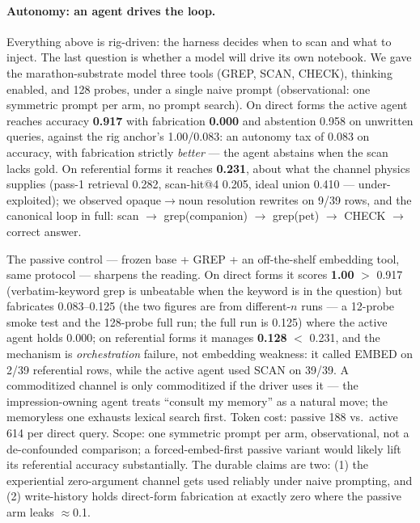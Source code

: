 \documentclass[11pt]{article}
\begin{document}
\paragraph{Autonomy: an agent drives the loop.} Everything above is rig-driven: the harness
decides when to scan and what to inject. The last question is whether a model will drive its
own notebook. We gave the marathon-substrate model three tools (GREP, SCAN, CHECK), thinking
enabled, and 128 probes, under a single naive prompt (observational: one symmetric prompt per
arm, no prompt search). On direct forms the active agent reaches accuracy \textbf{0.917} with
fabrication \textbf{0.000} and abstention 0.958 on unwritten queries, against the rig anchor's
1.00/0.083: an autonomy tax of 0.083 on accuracy, with fabrication strictly \emph{better} ---
the agent abstains when the scan lacks gold. On referential forms it reaches \textbf{0.231},
about what the channel physics supplies (pass-1 retrieval 0.282, scan-hit@4 0.205, ideal union
0.410 --- under-exploited); we observed opaque$\to$noun resolution rewrites on 9/39 rows, and
the canonical loop in full: scan $\to$ grep(companion) $\to$ grep(pet) $\to$ CHECK $\to$
correct answer.

The passive control --- frozen base + GREP + an off-the-shelf embedding tool, same protocol ---
sharpens the reading. On direct forms it scores \textbf{1.00} $>$ 0.917 (verbatim-keyword grep
is unbeatable when the keyword is in the question) but fabricates 0.083--0.125 (the two figures
are from different-$n$ runs --- a 12-probe smoke test and the 128-probe full run; the full run
is 0.125) where the active
agent holds 0.000; on referential forms it manages \textbf{0.128} $<$ 0.231, and the mechanism
is \emph{orchestration} failure, not embedding weakness: it called EMBED on 2/39 referential
rows, while the active agent used SCAN on 39/39. A commoditized channel is only commoditized if
the driver uses it --- the impression-owning agent treats ``consult my memory'' as a natural
move; the memoryless one exhausts lexical search first. Token cost: passive 188 vs.\ active 614
per direct query. Scope: one symmetric prompt per arm, observational, not a de-confounded
comparison; a forced-embed-first passive variant would likely lift its referential accuracy
substantially.
The durable claims are two: (1) the experiential zero-argument channel gets used reliably under
naive prompting, and (2) write-history holds direct-form fabrication at exactly zero where the
passive arm leaks $\approx$0.1.
\end{document}
